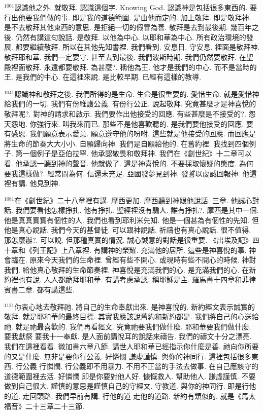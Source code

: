 \documentclass{book}
\begin{document}
$^{1001}$認識他之外.
就敬拜.
認識這個字.
Knowing God.
認識神是包括很多東西的.
要行出他要我們做的事.
即是我的道德範圍.
是由他而定的.
加上敬拜.
即是敬拜神.
是不去敬拜其他東西的意思.
是拒絕一切的假冒為善.
敬拜是去到最後期.
幾百年之後.
仍然有講這句說話.
是敬拜.
以他為中心.
以耶和華為中心.
所有政治環境的發展.
都要繼續敬拜.
所以在其他先知書裡.
我們看到.
安息日.
守安息.
裡面是敬拜神.
敬拜耶和華.
我們一定要守.
甚至去到最後.
我們波斯時期.
我們仍然要敬拜.
在聖殿裡面敬拜.
永遠都要敬拜.
為甚麼?.
稱他為王.
他才是我們的中心.
而不是當時的王.
是我們的中心.
在這裡來說.
是比較早期.
已經有這樣的教導.

$^{1041}$認識神和敬拜之後.
我們所得的是生命.
生命是很重要的.
愛惜生命.
就是愛惜神給我們的一切.
我們有份維護公義.
有份行公正.
說起敬拜.
究竟甚麼才是神喜悅的敬拜呢?.
對神的請求和啟示.
我們要作出他接受的回應.
有些甚麼是不接受的?.
怨天怨地.
你強行來.
叫我來而已.
那些不是他喜歡聽的.
是我們要他接受的回應.
要有感恩.
我們願意表示愛意.
願意遵守他的吩咐.
這些就是他接受的回應.
而回應是將生命的節奏大大小小.
自願歸向神.
我們是自願給他的.
在舊約裡.
我找到四個例子.
第一個例子是亞伯拉罕.
他承認敬畏和敬拜神.
我們在《創世紀》十二章可以看.
他承認一聽到神的聲音.
他就做了.
這是神喜悅的.
不要採取懷疑的態度.
為何要我這樣做?.
經常問為何.
信還未充足.
亞國發夢見到神.
發誓以虔誠回報神.
他這裡有講.
他見到神.

$^{1081}$在《創世紀》二十八章裡有講.
摩西更加.
摩西聽到神跟他說話.
三章.
他誠心對話.
我們要看他怎樣掙扎.
他有掙扎.
聖經裡沒有騙人.
誰有掙扎?.
摩西是其中一個.
他是真真實實有個性的人.
我們也看到耶利米先知.
他是一個甚為有個性的先知.
但他是真心說話.
我們今天的基督徒.
可以跟神說話.
祈禱也有真心說話.
很不值得.
那怎麼辦?.
可以說.
但那種真實的情況.
誠心誠意的對話是很重要.
《出埃及記》四十章和《列王記》上八章裡.
有講神的榮耀.
充滿他的居所.
這些是神喜悅的事.
神會臨在.
原來今天我們的生命裡.
曾經有些不開心.
或現時有些不開心的時候.
神對我們.
給他真心敬拜的生命節奏裡.
神喜悅是充滿我們的心.
是充滿我們的心.
在新約裡也有說.
人人都跪拜耶和華.
有講考慮承認.
稱耶穌是主.
羅馬書十四章和菲律賓書二章.
都有講這些.

$^{1121}$你衷心地去敬拜祂.
將自己的生命奉獻出來.
是神喜悅的.
新約經文表示誠實的敬拜.
就是耶和華的最終目標.
其實我應該說舊約和新約都是.
我們將自己的心送給祂.
就是祂最喜歡的.
我們再看經文.
究竟祂要我們做什麼.
耶和華要我們做什麼.
要我獻祭 要我十一奉獻.
是人面前講悅耳的說話來禱告.
我們的禱文十分之漂亮.
我們在這裡看看.
微加書六章八節.
講世人耶和華已經指示你什麼是善.
祂向你所要的又是什麼.
無非是要你行公義.
好憐憫 謙虛謹慎.
與你的神同行.
這裡包括很多東西.
行公義 行憐憫.
行公義即不用暴力.
不用不正當的手法去做事.
在自己應該守的道德範圍裡去活.
好憐憫 即是你要對他人好.
慷慨救人.
幫助他人.
謙虛謹慎.
不要做到自己很大.
謹慎的意思是謹慎自己的守經文.
守教道.
與你的神同行.
即是行他的道.
走回頭路.
我們早前有講.
行他的道 走他的道路.
新約有類似的.
就是《馬太福音》二十三章二十三節.
\end{document}
